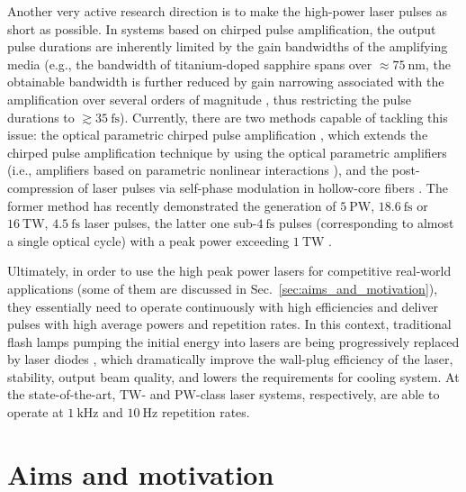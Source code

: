\documentclass[10pt, a4paper, twoside, openright]{report}
\begin{document}
Another very active research direction is to make the high-power laser pulses as short as possible. In systems based on chirped pulse amplification, the output pulse durations are inherently limited by the gain bandwidths of the amplifying media (e.g., the bandwidth of titanium-doped sapphire spans over $ \approx 75 \ \mathrm{nm} $, the obtainable bandwidth is further reduced by gain narrowing associated with the amplification over several orders of magnitude \cite{Hotz1965}, thus restricting the pulse durations to $ \gtrsim 35 \ \mathrm{fs} $). Currently, there are two methods capable of tackling this issue: the optical parametric chirped pulse amplification \cite{Dubietis1992}, which extends the chirped pulse amplification technique by using the optical parametric amplifiers (i.e., amplifiers based on parametric nonlinear interactions \cite{Giordmaine1965, Baumgartner1979}), and the post-compression of laser pulses via self-phase modulation in hollow-core fibers \cite{Nisoli1996}. The former method has recently demonstrated the generation of $ 5 \ \mathrm{PW} $, $ 18.6 \ \mathrm{fs} $ \cite{Zeng2017} or $ 16 \ \mathrm{TW} $, $ 4.5 \ \mathrm{fs} $ \cite{Rivas2017} laser pulses, the latter one sub-$ 4 \ \mathrm{fs} $ pulses (corresponding to almost a single optical cycle) with a peak power exceeding $ 1 \ \mathrm{TW} $ \cite{Ouille2020, Nagy2020}.

Ultimately, in order to use the high peak power lasers for competitive real-world applications (some of them are discussed in Sec.~\ref{sec:aims_and_motivation}), they essentially need to operate continuously with high efficiencies and deliver pulses with high average powers and repetition rates. In this context, traditional flash lamps pumping the initial energy into lasers are being progressively replaced by laser diodes \cite{Byer1988}, which dramatically improve the wall-plug efficiency of the laser, stability, output beam quality, and lowers the requirements for cooling system. At the state-of-the-art, $ \mathrm{TW} $- and $ \mathrm{PW} $-class laser systems, respectively, are able to operate at $ 1 \ \mathrm{kHz} $ \cite{Budriunas2017, Toth2020} and $ 10 \ \mathrm{Hz} $ \cite{Haefner2017, Osvay2019} repetition rates.


\section{Aims and motivation\label{sec:aims_and_motivation}}
%
\end{document}
